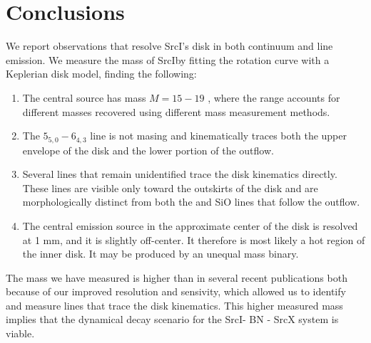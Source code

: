 \documentclass[twocolumn]{aastex61}
\newcommand{\sourcei}{SrcI}
\newcommand{\sourcex}{SrcX}
\begin{document}
\section{Conclusions}
\label{sec:conclusions}
We report observations that resolve \sourcei's disk in both continuum
and line emission.  We measure the mass of \sourcei by fitting the 
rotation curve with a Keplerian disk model, finding the following:

\begin{enumerate}
    \item The central source has mass $M=15-19$ \msun, where the range
        accounts for different masses recovered using different mass
        measurement methods.
    \item The \water $5_{5,0}-6_{4,3}$ line is not masing and kinematically
        traces both the upper envelope of the disk and the lower portion of
        the outflow.
    \item Several lines that remain unidentified trace the disk kinematics
        directly.  These lines are visible only toward the outskirts of the
        disk and are morphologically distinct from both the \water and SiO
        lines that follow the outflow.
    \item The central emission source in the approximate center of the disk
        is resolved at 1 mm, and it is slightly off-center.  It therefore is
        most likely a hot region of the inner disk.  It may be produced
        by an unequal mass binary.
\end{enumerate}

The mass we have measured is higher than in several recent publications both
because of our improved resolution and sensivity, which allowed us to identify
and measure lines that trace the disk kinematics.  This higher measured mass
implies that the dynamical decay scenario for the \sourcei - BN - \sourcex
system is viable.



\appendix
\end{document}
